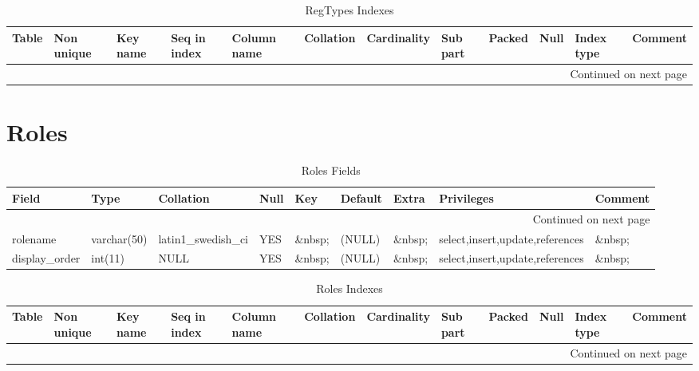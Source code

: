 \documentclass[tablesignature]{scrartcl}
\begin{document}
\begin{longtable}{|l|l|l|l|l|l|l|l|l|l|l|l|}
\caption{RegTypes Indexes} \label{tbl:regtypesindexes}\\
\hline
 Table     &  Non unique  &  Key name  &  Seq in index  &  Column name  &  Collation  &  Cardinality  &  Sub part  &  Packed  &  Null     &  Index type  &  Comment \\
\hline
\endhead
\hline\multicolumn{12}{r}{Continued on next page}\
\endfoot
\endlastfoot
\hline
 RegTypes  &           0  &  PRIMARY   &             1  &  regtype      &  A          &            9  &  (NULL)    &  (NULL)  &  \&nbsp;  &  BTREE       &  \&nbsp;  \\
\hline
\end{longtable}
\section{Roles}
\label{sec-20}


\begin{longtable}{|l|l|l|l|l|l|l|l|l|}
\caption{Roles Fields} \label{tbl:rolesfields}\\
\hline
 Field             &  Type         &  Collation                &  Null     &  Key      &  Default  &  Extra              &  Privileges                       &  Comment \\
\hline
\endhead
\hline\multicolumn{9}{r}{Continued on next page}\
\endfoot
\endlastfoot
\hline
 roleid            &  int(11)      &  NULL                     &  \&nbsp;  &  PRI      &  (NULL)   &  auto\_{}increment  &  select,insert,update,references  &  \&nbsp;  \\
 rolename          &  varchar(50)  &  latin1\_{}swedish\_{}ci  &  YES      &  \&nbsp;  &  (NULL)   &  \&nbsp;            &  select,insert,update,references  &  \&nbsp;  \\
 display\_{}order  &  int(11)      &  NULL                     &  YES      &  \&nbsp;  &  (NULL)   &  \&nbsp;            &  select,insert,update,references  &  \&nbsp;  \\
\hline
\end{longtable}


\begin{longtable}{|l|l|l|l|l|l|l|l|l|l|l|l|}
\caption{Roles Indexes} \label{tbl:rolesindexes}\\
\hline
 Table  &  Non unique  &  Key name  &  Seq in index  &  Column name  &  Collation  &  Cardinality  &  Sub part  &  Packed  &  Null     &  Index type  &  Comment \\
\hline
\endhead
\hline\multicolumn{12}{r}{Continued on next page}\
\endfoot
\endlastfoot
\hline
 Roles  &           0  &  PRIMARY   &             1  &  roleid       &  A          &           12  &  (NULL)    &  (NULL)  &  \&nbsp;  &  BTREE       &  \&nbsp;  \\
\hline
\end{longtable}
\end{document}
